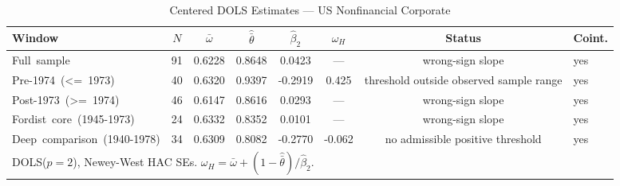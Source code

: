 \begin{table}[htbp]
\centering
\caption{Centered DOLS Estimates --- US Nonfinancial Corporate}
\label{tab:dols_centered_us}
\small
\begin{tabular}{l c c c c c c l}
\hline
Window & $N$ & $\bar{\omega}$ & $\hat{\bar{\theta}}$ & $\hat{\beta}_2$ & $\omega_H$ & Status & Coint. \\
\hline
Full~sample & 91 & 0.6228 & 0.8648 & 0.0423 & --- & wrong-sign slope & yes \\
Pre-1974~(<=~1973) & 40 & 0.6320 & 0.9397 & -0.2919 & 0.425 & threshold outside observed sample range & yes \\
Post-1973~(>=~1974) & 46 & 0.6147 & 0.8616 & 0.0293 & --- & wrong-sign slope & yes \\
Fordist~core~(1945-1973) & 24 & 0.6332 & 0.8352 & 0.0101 & --- & wrong-sign slope & yes \\
Deep~comparison~(1940-1978) & 34 & 0.6309 & 0.8082 & -0.2770 & -0.062 & no admissible positive threshold & yes \\
\hline
\multicolumn{8}{l}{\footnotesize DOLS($p=2$), Newey-West HAC SEs. $\omega_H = \bar{\omega} + (1-\hat{\bar{\theta}})/\hat{\beta}_2$.}
\end{tabular}
\end{table}
